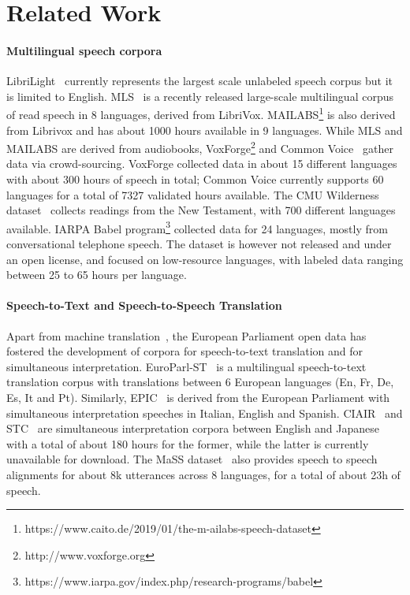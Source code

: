 \documentclass[11pt,a4paper]{article}
\begin{document}
\section{Related Work}

\paragraph{Multilingual speech corpora}
LibriLight~\citep{kahn2020libri} currently represents the largest scale unlabeled speech corpus but it is limited to English.
MLS~\cite{Pratap2020} is a recently released large-scale multilingual corpus of read speech in 8 languages, derived from LibriVox.
MAILABS\footnote{https://www.caito.de/2019/01/the-m-ailabs-speech-dataset} is also derived from Librivox and has about 1000 hours available in 9 languages.
While MLS and MAILABS are derived from audiobooks, VoxForge\footnote{http://www.voxforge.org} and Common Voice~\citep{ardila-etal-2020-common} gather data via crowd-sourcing. VoxForge collected data in about 15 different languages with about 300 hours of speech in total; Common Voice currently supports 60 languages for a total of 7327 validated hours available.
The CMU Wilderness dataset~\citep{black2019cmu} collects readings from the New Testament, with 700 different languages available.
IARPA Babel program\footnote{https://www.iarpa.gov/index.php/research-programs/babel} collected data for 24 languages, mostly
from conversational telephone speech. The dataset is however not released and under an open license, and focused on low-resource languages, with labeled data ranging between 25 to 65 hours per language.

\paragraph{Speech-to-Text and Speech-to-Speech Translation}

Apart from machine translation~\citep{koehn2005europarl}, the European Parliament open data has fostered the development of corpora for speech-to-text translation and for simultaneous interpretation. EuroParl-ST~\citep{iranzo2020europarl} is a multilingual speech-to-text translation corpus with translations between 6 European languages (En, Fr, De, Es, It and Pt). Similarly, EPIC~\citep{bendazzoli2005approach} is derived from the European Parliament with simultaneous interpretation speeches in Italian, English and Spanish. CIAIR~\citep{tohyama2004ciair} and STC~\citep{shimizu2014collection} are simultaneous interpretation corpora between English and Japanese with a total of about 180 hours for the former, while the latter is currently unavailable for download. The MaSS dataset~\citep{zanon-boito-etal-2020-mass} also provides speech to speech alignments for about 8k utterances across 8 languages, for a total of about 23h of speech.
\end{document}
